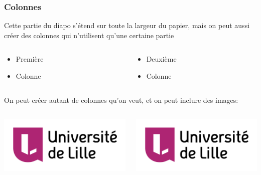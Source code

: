 \documentclass[svgnames,12pt,aspectratio=149]{beamer}
\begin{document}
\begin{frame}
  \frametitle{Colonnes}
  Cette partie du diapo s'étend sur toute la largeur du papier, mais on peut aussi créer des colonnes qui n'utilisent qu'une certaine partie

  \begin{columns}
    \begin{column}{0.5\textwidth}
      \begin{itemize}
      \item Première 
      \item Colonne
      \end{itemize}
    \end{column}
    \begin{column}{0.5\textwidth}
      \begin{itemize}
      \item Deuxième
      \item Colonne
      \end{itemize}
    \end{column}
  \end{columns}

  \vspace{1cm}
    On peut créer autant de colonnes qu'on veut, et on peut inclure des images:

    
  \begin{columns}
    \begin{column}{0.33\textwidth}
      \includegraphics[width=1.0\textwidth]{logo-UdLille}
    \end{column}
    \begin{column}{0.33\textwidth}
      \includegraphics[width=1.0\textwidth]{logo-UdLille}
    \end{column}


\end{columns}
\end{frame}
\end{document}
